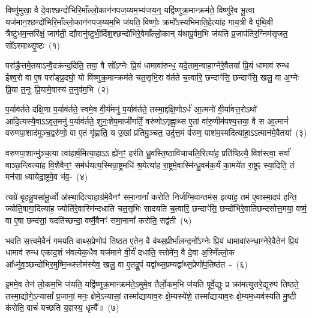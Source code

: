 \setcounter{anuvakam}{0}
विष्णु॑मुखा॒ वै दे॒वाश्छन्दो॑भिरि॒माँल्लो॒कान॑नपज॒य्यम॒भ्य॑जय॒न्॒ यद्वि॑ष्णुक्र॒मान्क्रम॑ते॒ विष्णु॑रे॒व भू॒त्वा यज॑मान॒श्छन्दो॑भिरि॒माँल्लो॒कान॑नपज॒य्यम॒भि ज॑यति॒ विष्णोः॒ क्रमो᳚\-ऽस्यभिमाति॒हेत्या॑ह गाय॒त्री वै पृ॑थि॒वी त्रैष्टु॑भम॒न्तरि॑क्षं॒ जाग॑ती॒ द्यौरानु॑ष्टुभी॒र्दिश॒श्छन्दो॑भि\-रे॒वेमाँल्लो॒कान् य॑थापू॒र्वम॒भि ज॑यति प्र॒जा\-प॑तिर॒ग्निम॑सृजत॒ सो᳚\-ऽस्माथ्सृ॒ष्टः~(१)\ip

परा॑ङै॒त्तमे॒तयाऽन्वै॒दक्र॑न्द॒दिति॒ तया॒ वै सो᳚\-ऽग्नेः प्रि॒यं धामावा॑रुन्ध॒ यदे॒ताम॒न्वाहा॒ग्नेरे॒वैतया᳚ प्रि॒यं धामाव॑ रुन्ध ईश्व॒रो वा ए॒ष परा᳚ङ्प्र॒दघो॒ यो वि॑ष्णुक्र॒मान्क्रम॑ते चत॒सृभि॒रा व॑र्तते च॒त्वारि॒ छन्दाꣳ॑सि॒ छन्दाꣳ॑सि॒ खलु॒ वा अ॒ग्नेः प्रि॒या त॒नूः प्रि॒यामे॒वास्य॑ त॒नुव॑म॒भि~(२)\ip

प॒र्याव॑र्तते दक्षि॒णा प॒र्याव॑र्तते॒ स्वमे॒व वी॒र्य॑मनु॑ प॒र्याव॑र्तते॒ तस्मा॒द्दक्षि॒णो\-ऽर्ध॑ आ॒त्मनो॑ वी॒र्या॑वत्त॒रो\-ऽथो॑ आदि॒त्यस्यै॒वा\-ऽऽवृत॒मनु॑ प॒र्याव॑र्तते॒ शुनः॒शेप॒माजी॑गर्तिं॒ वरु॑णो\-ऽगृह्णा॒थ्स ए॒तां वा॑रु॒णीम॑पश्य॒त्तया॒ वै स आ॒त्मानं॑ वरुणपा॒शाद॑मुञ्च॒द्वरु॑णो॒ वा ए॒तं गृ॑ह्णाति॒ य उ॒खां प्र॑तिमु॒ञ्चत॒ उदु॑त्त॒मं व॑रुण॒ पाश॑म॒स्मदित्या॑हा॒\-ऽऽ\-त्मान॑मे॒वैतया॑~(३)\ip

वरुणपा॒शान्मु॑ञ्च॒त्या त्वा॑हार्\mbox{}ष॒मित्या॒हाऽऽ ह्ये॑न॒ꣳ॒ हर॑ति ध्रु॒वस्ति॒ष्ठावि॑चाचलि॒रित्या॑ह॒ प्रति॑ष्ठित्यै॒ विश॑स्त्वा॒ सर्वा॑ वाञ्छ॒न्त्वित्या॑ह वि॒शैवैन॒ꣳ॒ सम॑र्धयत्य॒स्मिन्रा॒ष्ट्रमधि॑ श्र॒येत्या॑ह रा॒ष्ट्रमे॒वास्मि॑न्ध्रु॒वम॑क॒र्यं का॒मये॑त रा॒ष्ट्रꣴ स्या॒दिति॒ तं मन॑सा ध्यायेद्रा॒ष्ट्रमे॒व भ॑व॒-~(४)\ip

त्यग्रे॑ बृ॒हन्नु॒षसा॑मू॒र्ध्वो अ॑स्था॒दित्या॒हाग्र॑मे॒वैनꣳ॑ समा॒नानां᳚ करोति निर्जग्मि॒वान्तम॑स॒ इत्या॑ह॒ तम॑ ए॒वास्मा॒दप॑ हन्ति॒ ज्योति॒षागा॒दित्या॑ह॒ ज्योति॑रे॒वास्मि॑न्दधाति चत॒सृभिः॑ सादयति च॒त्वारि॒ छन्दाꣳ॑सि॒ छन्दो॑भिरे॒वाति॑छन्दसोत्त॒मया॒ वर्ष्म॒ वा ए॒षा छन्द॑सां॒ यदति॑च्छन्दा॒ वर्ष्मै॒वैनꣳ॑ समा॒नानां᳚ करोति॒ सद्व॑ती~(५)\ip

भवति स॒त्त्वमे॒वैनं॑ गमयति वाथ्स॒प्रेणोप॑ तिष्ठत ए॒तेन॒ वै व॑थ्स॒प्रीर्भा॑लन्द॒नो᳚\-ऽग्नेः प्रि॒यं धामावा॑रुन्धा॒ग्नेरे॒वैतेन॑ प्रि॒यं धामाव॑ रुन्ध एकाद॒शं भ॑वत्येक॒धैव यज॑माने वी॒र्यं॑ दधाति॒ स्तोमे॑न॒ वै दे॒वा अ॒स्मिँल्लो॒क आ᳚र्ध्नुव॒ञ्छन्दो॑भिर॒मुष्मि॒न्थ्स्तोम॑स्येव॒ खलु॒ वा ए॒तद्रू॒पं यद्वा᳚थ्स॒प्रम्यद्वा᳚थ्स॒प्रेणो॑प॒तिष्ठ॑त~-~(६)\ip

इ॒ममे॒व तेन॑ लो॒कम॒भि ज॑यति॒ यद्वि॑ष्णुक्र॒मान्क्रम॑ते॒\-ऽमुमे॒व तैर्लो॒कम॒भि ज॑यति पूर्वे॒द्युः प्र क्रा॑मत्युत्तरे॒द्युरुप॑ तिष्ठते॒ तस्मा॒द्योगे॒\-ऽन्यासां᳚ प्र॒जानां॒ मनः॒ क्षेमे॒\-ऽन्यासां॒ तस्मा᳚द्\-यायाव॒रः क्षे॒म्यस्ये॑शे॒ तस्मा᳚द्\-यायाव॒रः क्षे॒म्यम॒ध्यव॑स्यति मु॒ष्टी क॑रोति॒ वाचं॑ यच्छति य॒ज्ञस्य॒ धृत्यै᳚॥~(७)\ip

